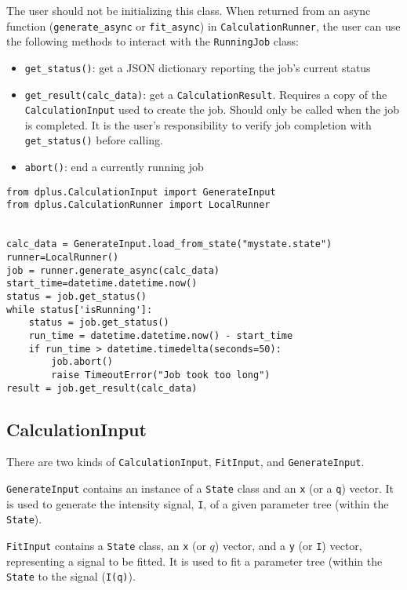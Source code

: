 \documentclass[../D+Manual.tex]{subfiles}
\begin{document}
The user should not be initializing this class. When returned from an
async function (\texttt{generate\_async} or \texttt{fit\_async}) in \texttt{CalculationRunner}, the user can use the following
methods to interact with the \texttt{RunningJob} class:

\begin{itemize}
	\tightlist
	\item
	\texttt{get\_status()}: get a JSON dictionary reporting the job's
	current status
	\item
	\texttt{get\_result(calc\_data)}: get a \texttt{CalculationResult}.
	Requires a copy of the \texttt{CalculationInput} used to create the job. Should
	only be called when the job is completed. It is the user's responsibility
	to verify job completion with \texttt{get\_status()} before calling.
	\item
	\texttt{abort()}: end a currently running job
\end{itemize}

\begin{lstlisting}[style=pythonstyle]
from dplus.CalculationInput import GenerateInput
from dplus.CalculationRunner import LocalRunner


calc_data = GenerateInput.load_from_state("mystate.state")
runner=LocalRunner()
job = runner.generate_async(calc_data)
start_time=datetime.datetime.now()
status = job.get_status()
while status['isRunning']:
	status = job.get_status()
	run_time = datetime.datetime.now() - start_time
	if run_time > datetime.timedelta(seconds=50):
		job.abort()
		raise TimeoutError("Job took too long")
result = job.get_result(calc_data)
\end{lstlisting}

\subsection{CalculationInput}\label{calculationinput}

There are two kinds of \texttt{CalculationInput}, \texttt{FitInput}, and \texttt{GenerateInput}.

\texttt{GenerateInput} contains an instance of a \texttt{State} class and an \texttt{x} (or a \texttt{q})
vector. It is used to generate the intensity signal, \texttt{I}, of a given parameter tree (within the \texttt{State}).

\texttt{FitInput} contains a \texttt{State} class, an \texttt{x} (or $q$) vector, and a \texttt{y} (or \texttt{I}) vector, representing a signal to be fitted.
It is used to fit a parameter tree (within the \texttt{State} to the signal (\texttt{I(q)}).
\end{document}
